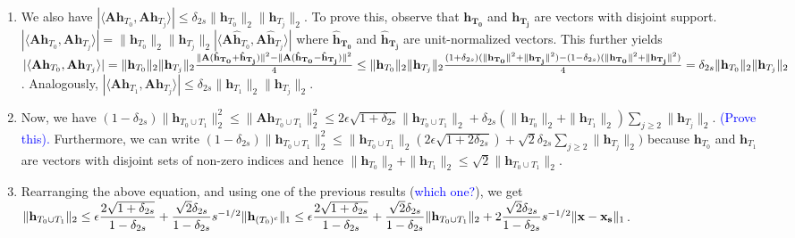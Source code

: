 \documentclass[11pt]{article}
\begin{document}
\begin{enumerate}
\begin{enumerate}
\begin{enumerate}
\item We also have $|\langle \mathbf{Ah}_{T_0}, \mathbf{Ah}_{T_j}\rangle| \leq \delta_{2s} \|\mathbf{h}_{T_0}\|_2 \|\mathbf{h}_{T_j}\|_2$. To prove this, observe that $\mathbf{h_{T_0}}$ and $\mathbf{h_{T_j}}$ are vectors with disjoint support. $|\langle \mathbf{Ah}_{T_0}, \mathbf{Ah}_{T_j}\rangle| = \|\mathbf{h}_{T_0}\|_2 \|\mathbf{h}_{T_j}\|_2|\langle \mathbf{A\hat{h}}_{T_0}, \mathbf{A\hat{h}}_{T_j}\rangle|$  where $\mathbf{\hat{h}_{T_0}}$ and $\mathbf{\hat{h}_{T_j}}$ are unit-normalized vectors. This further yields $|\langle \mathbf{Ah}_{T_0}, \mathbf{Ah}_{T_j}\rangle|=\|\mathbf{h}_{T_0}\|_2 \|\mathbf{h}_{T_j}\|_2 \frac{\|\mathbf{A}(\mathbf{\hat{h}_{T_0}}+\mathbf{\hat{h}_{T_j}})\|^2 - \|\mathbf{A}(\mathbf{\hat{h}_{T_0}}-\mathbf{\hat{h}_{T_j}})\|^2}{4} 
\\ \leq \|\mathbf{h}_{T_0}\|_2 \|\mathbf{h}_{T_j}\|_2 \frac{(1+\delta_{2s})(\|\mathbf{h_{T_0}}\|^2+\|\mathbf{h_{T_j}}\|^2)-(1-\delta_{2s})(\|\mathbf{h_{T_0}}\|^2+\|\mathbf{h_{T_j}}\|^2)}{4} \\
= \delta_{2s} \|\mathbf{h}_{T_0}\|_2 \|\mathbf{h}_{T_j}\|_2$. Analogously, $|\langle \mathbf{Ah}_{T_1}, \mathbf{Ah}_{T_j}\rangle| \leq \delta_{2s} \|\mathbf{h}_{T_1}\|_2 \|\mathbf{h}_{T_j}\|_2$. 
\item Now, we have $(1-\delta_{2s})\|\mathbf{h}_{T_0 \cup T_1}\|^2_2 
\leq \|\mathbf{Ah}_{T_0 \cup T_1}\|^2_2 \leq 2 \epsilon \sqrt{1+\delta_{2s}}\|\mathbf{h}_{T_0 \cup T_1}\|_2 + \delta_{2s}(\|\mathbf{h}_{T_0}\|_2 + \|\mathbf{h}_{T_1}\|_2) \sum_{j \geq 2} \|\mathbf{h}_{T_j}\|_2$. \textcolor{blue}{(Prove this).} Furthermore, we can write $(1-\delta_{2s})\|\mathbf{h}_{T_0 \cup T_1}\|^2_2  \leq \|\mathbf{h}_{T_0 \cup T_1}\|_2(2\epsilon\sqrt{1+2\delta_{2s}}) + \sqrt{2}\delta_{2s} \sum_{j \geq 2} \|\mathbf{h}_{T_j}\|_2)$ because $\mathbf{h}_{T_0}$ and $\mathbf{h}_{T_1}$ are vectors with disjoint sets of non-zero indices and hence $\|\mathbf{h}_{T_0}\|_2 + \|\mathbf{h}_{T_1}\|_2 \leq \sqrt{2} \|\mathbf{h}_{T_0 \cup T_1}\|_2$.
\item Rearranging the above equation, and using one of the previous results (\textcolor{blue}{which one?}), 
we get $\|\mathbf{h}_{T_0 \cup T_1}\|_2 \leq \epsilon \dfrac{2\sqrt{1+\delta_{2s}}}{1-\delta_{2s}} + \dfrac{\sqrt{2}{\delta_{2s}}}{1-\delta_{2s}} s^{-1/2} \|\mathbf{h}_{(T_0)^c}\|_1 
\\ \leq \epsilon \dfrac{2\sqrt{1+\delta_{2s}}}{1-\delta_{2s}} + \dfrac{\sqrt{2}\delta_{2s}}{1-\delta_{2s}} \|\mathbf{h}_{T_0 \cup T_1}\|_2 + 2\dfrac{\sqrt{2}\delta_{2s}} {1-\delta_{2s}} s^{-1/2} \|\mathbf{x}-\mathbf{x_s}\|_1$. \\

\end{enumerate}
\end{enumerate}
\end{enumerate}
\end{document}
